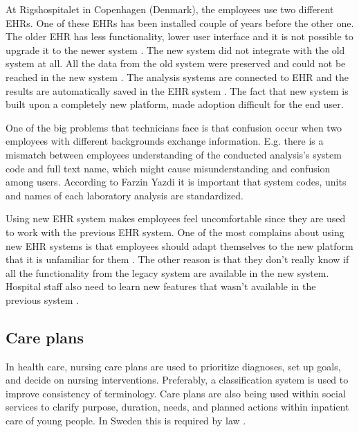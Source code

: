 \documentclass[14pt]{article}
\begin{document}
At Rigshospitalet in Copenhagen (Denmark), the employees use two different EHRs. One of these EHRs has been installed couple of years before the other one. The older EHR has less functionality, lower user interface and it is not possible to upgrade it to the newer system \cite{FarzinYazdi}. The new system did not integrate with the old system at all. All the data from the old system were preserved and could not be reached in the new system \cite{FarzinYazdi}. The analysis systems are connected to EHR and the results are automatically saved in the EHR system \cite{FarzinYazdi}. The fact that new system is built upon a completely new platform, made adoption difficult for the end user\cite{FarzinYazdi}.

One of the big problems that technicians face is that confusion occur when two employees with different backgrounds exchange information. E.g. there is a mismatch between employees understanding of the conducted analysis's system code and full text name, which might cause misunderstanding and confusion among users\cite{FarzinYazdi}. According to Farzin Yazdi\cite{FarzinYazdi} it is important that system codes, units and names of each laboratory analysis are standardized.

Using new EHR system makes employees feel uncomfortable since they are used to work with the previous EHR system. One of the most complains about using new EHR systems is that employees should adapt themselves to the new platform that it is unfamiliar for them \cite{FarzinYazdi}. The other reason is that they don’t really know if all the functionality from the legacy system are available in the new system. Hospital staff also need to learn new features that wasn't available in the previous system \cite{FarzinYazdi}.
\label{sec:techMotiv}

\subsection{Care plans}
\label{sec:interopPlans}
In health care, nursing care plans are used to prioritize diagnoses, set up goals, and decide on nursing interventions. Preferably, a classification system is used to improve consistency of terminology. Care plans are also being used within social services to clarify purpose, duration, needs, and planned actions within inpatient care of young people. In Sweden this is required by law \cite{SocialServices}.
\end{document}
